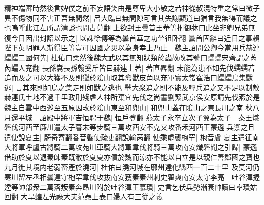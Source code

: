 精神端審時然後言婢僕之前不妄語笑由是尊卑大小敬之若神從叔混特重之常曰微子異不傷物同不害正吾無間然|{
	呂大臨曰無間隙可言其失謝顯道曰猶言我無得而議之也嗚呼此江左所謂清談也問古莧翻}
上欲封王曇首王華等拊御牀曰此坐非卿兄弟無復今日因出封詔以示之|{
	以誅徐傅等為曇首華之功坐徂卧翻}
曇首固辭曰近日之事賴陛下英明罪人斯得臣等豈可因國之災以為身幸上乃止　魏主詔問公卿今當用兵赫連蠕蠕二國何先|{
	杜佑曰柔然後魏大武以其無知狀類於蟲故改其號曰蠕蠕宋齊謂之芮芮蠕人兖翻}
長孫嵩長孫翰奚斤皆曰赫連土著|{
	著直畧翻}
未能為患不如先伐蠕蠕若追而及之可以大獲不及則獵於隂山取其禽獸皮角以充軍實太常崔浩曰蠕蠕鳥集獸逃|{
	言其來則如鳥之集走則如獸之逃也}
舉大衆追之則不能及輕兵追之又不足以制敵赫連氏土地不過千里政刑殘虐人神所棄宜先伐之尚書劉絜武京侯安原請先伐燕於是魏主自雲中西巡至五原因畋於隂山東至和兜山|{
	和兜山蓋在隂山之東長川之南}
秋八月還平城　詔殿中將軍吉恒聘于魏|{
	恒戶登翻}
燕太子永卒立次子翼為太子　秦王熾磐伐河西至廉川遣太子暮末等步騎三萬攻西安不克又攻番禾河西王蒙遜兵禦之且遣使說夏主|{
	騎奇寄翻番音磐使疏吏翻說輸芮翻}
使乘虛襲枹罕|{
	枹音膚}
夏主遣征南大將軍呼盧古將騎二萬攻苑川車騎大將軍韋伐將騎三萬攻南安熾磐聞之引歸|{
	蒙遜借助於夏以退秦師秦既敝於夏夏亦僨於魏而涼亦不能以自立是以親仁善鄰國之寶也}
九月徙其境内老弱畜產於澆河|{
	杜佑曰澆河城在廓州達化縣西一百二十里}
及莫河仍寒川留左丞相曇達守枹罕韋伐攻抜南安獲秦秦州刺史翟爽南安太守李亮　吐谷渾握逵等帥部衆二萬落叛秦奔昂川附於吐谷渾王慕璝|{
	史言乞伏兵勢漸衰帥讀曰率璝姑回翻}
大旱蝗左光祿大夫范泰上表曰婦人有三從之義

